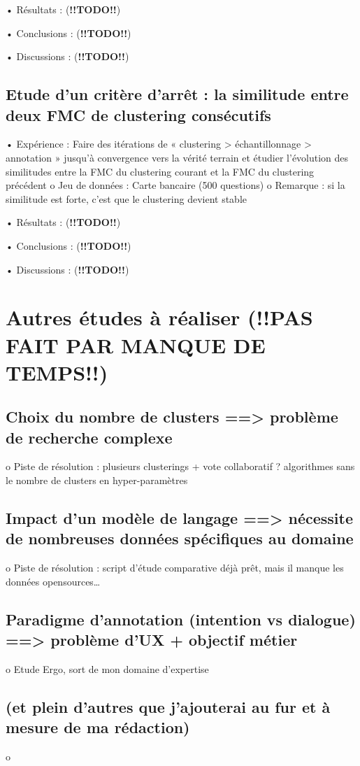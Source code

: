         •	Résultats : (\textbf{!!TODO!!})

        •	Conclusions : (\textbf{!!TODO!!})

        •	Discussions : (\textbf{!!TODO!!})


        \subsection{Etude d’un critère d’arrêt : la similitude entre deux FMC de clustering consécutifs}

        •	Expérience : Faire des itérations de « clustering > échantillonnage > annotation » jusqu’à convergence vers la vérité terrain et étudier l’évolution des similitudes entre la FMC du clustering courant et la FMC du clustering précédent
            o	Jeu de données : Carte bancaire (500 questions)
            o	Remarque : si la similitude est forte, c’est que le clustering devient stable

        •	Résultats : (\textbf{!!TODO!!})

        •	Conclusions : (\textbf{!!TODO!!})

        •	Discussions : (\textbf{!!TODO!!})

    \section{Autres études à réaliser (!!PAS FAIT PAR MANQUE DE TEMPS!!)}

        \subsection{Choix du nombre de clusters ==> problème de recherche complexe}
            o	Piste de résolution : plusieurs clusterings + vote collaboratif ? algorithmes sans le nombre de clusters en hyper-paramètres

        \subsection{Impact d’un modèle de langage ==> nécessite de nombreuses données spécifiques au domaine}
            o	Piste de résolution : script d’étude comparative déjà prêt, mais il manque les données opensources… 

        \subsection{Paradigme d’annotation (intention vs dialogue) ==> problème d’UX + objectif métier}
            o	Etude Ergo, sort de mon domaine d’expertise

        \subsection{(et plein d’autres que j’ajouterai au fur et à mesure de ma rédaction)}
            o	
